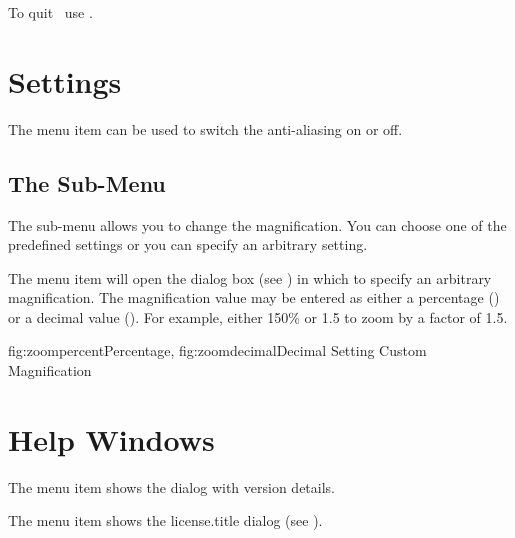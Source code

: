 
To quit \JDRView\ use .


\chapter{Settings}
\label{sec:settings}


The  menu item can be used to switch
the anti-aliasing on or off.

\section{The  Sub-Menu}
\label{sec:zoommenu}


The  sub-menu allows you to change
the magnification. You can choose one of the predefined
settings or you can specify an arbitrary setting.


The  menu item will open the
 dialog box (see ) in
which to specify an arbitrary magnification.  The magnification
value may be entered as either a percentage
() or a decimal value
(). For example, either 150\% or 1.5 to
zoom by a factor of 1.5. 

 {
   {fig:zoompercent}{}{Percentage},
   {fig:zoomdecimal}{}{Decimal}
 }
 {Setting Custom Magnification}


\chapter{Help Windows}
\label{sec:helpwindows}


The  menu item shows the
dialog with version details.


The  menu item shows the
\InlineMsgDef
 {license.title}
dialog (see ).




